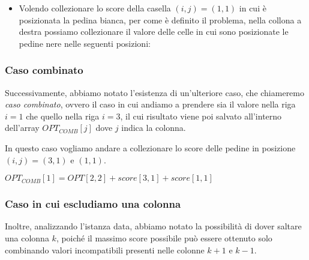 \begin{itemize}
	\item {
		Volendo collezionare lo score della casella $(i, j) = (1, 1)$ in cui è posizionata la pedina bianca, per come è definito il problema, nella collona a destra possiamo collezionare il valore delle celle in cui sono posizionate le pedine nere nelle seguenti posizioni:
		\newline
		\begin{enumerate*}[label={}]   
			\item{
			      \chessboard[
			      	zero=false, %
			      	labelbottomformat=\arabic{filelabel},
			      	setpieces={Pa1, pb3},
			      ]
			      $OPT[1, 1] = OPT[3, 2] + score[1, 1]$ 
			}
			\item{
			      \chessboard[
			      	zero=false, %
			      	labelbottomformat=\arabic{filelabel},
			      	setpieces={Pa1, pb2},
			      ]
			      $OPT[1, 1] = OPT[2, 2] + score[1, 1]$ 
			}
		\end{enumerate*}
	}
\end{itemize}

\subsubsection*{Caso combinato}

Successivamente, abbiamo notato l'esistenza di un'ulteriore caso, che chiameremo \textit{caso combinato}, ovvero il caso in cui andiamo a prendere sia 
il valore nella riga $i = 1$ che quello nella riga $i = 3$, il cui risultato viene poi salvato all'interno dell'array $OPT_{COMB}[j]$ dove $j$ indica la colonna.

In questo caso vogliamo andare a collezionare lo score delle pedine in posizione $(i, j) = (3, 1)$ e $(1, 1)$.

\chessboard[
	zero=false, %
	labelbottomformat=\arabic{filelabel},
	setpieces={Pa1, Pa3, pb2},
]

$OPT_{COMB}[1] = OPT[2, 2] + score[3, 1] + score[1, 1]$

\subsubsection*{Caso in cui escludiamo una colonna}

Inoltre, analizzando l'istanza data, abbiamo notato la possibilità di dover saltare una colonna $k$, poiché il massimo score possibile 
può essere ottenuto solo combinando valori incompatibili presenti nelle colonne $k+1$ e $k-1$.

